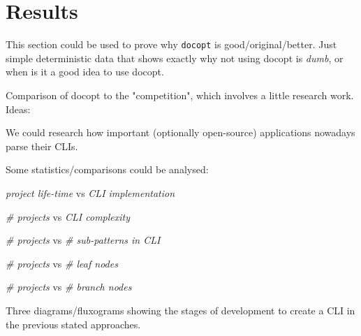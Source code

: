 \section{Results}

This section could be used to prove why \texttt{docopt} is good/original/better. Just simple deterministic data that shows exactly why not using docopt is \emph{dumb}, or when is it a good idea to use docopt.

Comparison of docopt to the "competition", which involves a little research work. Ideas:
\begin{compactitem}
\item We could research how important (optionally open-source) applications nowadays parse their CLIs.
\item Some statistics/comparisons could be analysed:
    \begin{compactitem}
    \item \emph{project life-time} vs \emph{CLI implementation}
    \item \emph{\# projects} vs \emph{CLI complexity}
    \item \emph{\# projects} vs \emph{\# sub-patterns in CLI}
    \item \emph{\# projects} vs \emph{\# leaf nodes}
    \item \emph{\# projects} vs \emph{\# branch nodes}
    \end{compactitem}
\item Three diagrams/fluxograms showing the stages of development to create a CLI in the previous stated approaches.
\end{compactitem}
